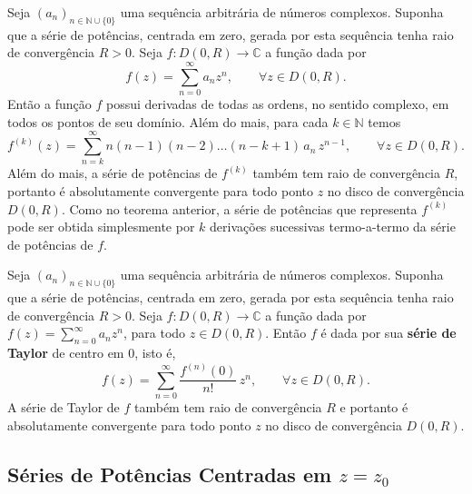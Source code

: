 


\begin{corolario}
\label{cor-deriva-termo-termo-serie-potencia}
Seja $(a_n)_{n\in\mathbb{N}\cup\{0\}}$ uma sequência arbitrária de números complexos.
Suponha que a série de potências, centrada em zero, gerada por esta sequência tenha raio de convergência $R>0$. 
Seja $f:D(0,R)\to\mathbb{C}$ a função dada por
\[
f(z) = \sum_{n=0}^{\infty}a_nz^n, \qquad \forall z\in D(0,R).
\]
Então a função $f$ possui derivadas de todas as ordens, no sentido complexo, em todos os 
pontos de seu domínio. Além do mais, para cada $k\in\mathbb{N}$ temos
\[
f^{(k)}(z) 
= 
\sum_{n=k}^{\infty}n(n-1)(n-2)\ldots(n-k+1) \, a_n \, z^{n-1}, \qquad\forall z\in D(0,R).
\]
Além do mais, a série de potências de $f^{(k)}$ também tem raio de convergência $R$,
portanto é absolutamente convergente para todo ponto $z$ no 
disco de convergência $D(0,R)$. Como no teorema anterior, a série de potências 
que representa $f^{(k)}$ pode ser obtida simplesmente 
por $k$ derivações sucessivas termo-a-termo da série de potências de $f$.
\end{corolario}



\begin{corolario}
\label{cor-serie-taylor-para-serie-pot}
Seja $(a_n)_{n\in\mathbb{N}\cup\{0\}}$ uma sequência arbitrária de números complexos.
Suponha que a série de potências, centrada em zero, gerada por esta sequência tenha raio de convergência $R>0$. 
Seja $f:D(0,R)\to\mathbb{C}$ a função dada por
$f(z) = \sum_{n=0}^{\infty}a_nz^n$, para todo $z\in D(0,R)$.
Então $f$ é dada por sua \textbf{série de Taylor} de centro em $0$, isto é,
\[
f(z) 
= 
\sum_{n=0}^{\infty}
\frac{f^{(n)}(0)}{n!} \, z^{n}, \qquad\forall z\in D(0,R).
\]
A série de Taylor de $f$ também tem raio de convergência $R$ e 
portanto é absolutamente convergente para todo ponto $z$ no 
disco de convergência $D(0,R)$.
\end{corolario}

\subsection[Séries de Potências Centradas em \texorpdfstring{$z=z_0$}{z=z0}]
{Séries de Potências Centradas em \texorpdfstring{\boldmath$z=z_0$}{z=z0}}
\label{subsec-series-pot-em-z0}


